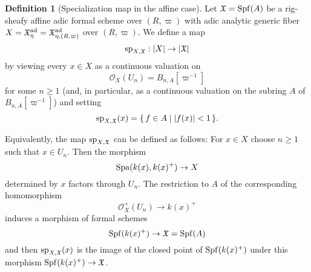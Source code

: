 \documentclass[12pt,twoside,a4paper]{article}
\theoremstyle{definition}
\newtheorem{mydef}[thm]{Definition}
\theoremstyle{remark}
\newcommand\ad{{\rm ad}}
\newcommand\spc{{\rm sp}}
\newcommand\Spa{{\rm Spa}}
\newcommand\Spf{{\rm Spf}}
\begin{document}
\begin{mydef}[Specialization map in the affine case]Let $\mathfrak{X}=\Spf(A)$ be a rig-sheafy affine adic formal scheme over $(R, \varpi)$ with adic analytic generic fiber $X=\mathfrak{X}_{\eta}^{\ad}=\mathfrak{X}_{\eta, (R, \varpi)}^{\ad}$ over $(R, \varpi)$. We define a map \begin{equation*}\spc_{X,\mathfrak{X}}: \vert X\vert\to \vert\mathfrak{X}\vert\end{equation*}by viewing every $x\in X$ as a continuous valuation on \begin{equation*}\mathcal{O}_{X}(U_{n})=B_{n,A}[\varpi^{-1}]\end{equation*}for some $n\geq1$ (and, in particular, as a continuous valuation on the subring $A$ of $B_{n,A}[\varpi^{-1}]$) and setting \begin{equation*}\spc_{X,\mathfrak{X}}(x)=\{\, f\in A\mid \vert f(x)\vert<1\,\}.\end{equation*}\end{mydef}Equivalently, the map $\spc_{X,\mathfrak{X}}$ can be defined as follows: For $x\in X$ choose $n\geq1$ such that $x\in U_{n}$. Then the morphism \begin{equation*}\Spa(k(x), k(x)^{+})\to X\end{equation*}determined by $x$ factors through $U_{n}$. The restriction to $A$ of the corresponding homomorphism \begin{equation*}\mathcal{O}_{X}^{+}(U_{n})\to k(x)^{+}\end{equation*}induces a morphism of formal schemes \begin{equation*}\Spf(k(x)^{+})\to \mathfrak{X}=\Spf(A)\end{equation*}and then $\spc_{X,\mathfrak{X}}(x)$ is the image of the closed point of $\Spf(k(x)^{+})$ under this morphism $\Spf(k(x)^{+})\to \mathfrak{X}$.
\end{document}
